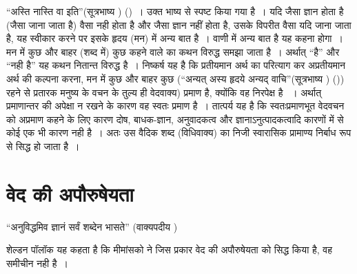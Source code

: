 \newpage

“अस्ति नास्ति वा इति”(सूत्रभाष्य ) ()~। उक्त भाष्य से स्पष्ट किया गया है~। यदि जैसा ज्ञान होता है (जैसा जाना जाता है) वैसा नही होता है और जैसा ज्ञान नहीं होता है, उसके विपरीत वैसा यदि जाना जाता है, यह स्वीकार करने पर इसके हृदय (मन) में अन्य बात है~। वाणी में अन्य बात है यह कहना होगा~। मन में कुछ और बाहर (शब्द में) कुछ कहने वाले का कथन विरुद्ध समझा जाता है~। अर्थात् “है” और “नही है” यह कथन नितान्त विरुद्ध है~। निष्कर्ष यह है कि प्रतीयमान अर्थ का परित्याग कर अप्रतीयमान अर्थ की कल्पना करना, मन में कुछ और बाहर कुछ (“अन्यत् अस्य हृदये अन्यद् वाचि”(सूत्रभाष्य ) ()) रहने से प्रतारक मनुष्य के वचन के तुल्य ही वेदवाक्य) प्रमाण है, क्योंकि वह निरपेक्ष है ~। अर्थात् प्रमाणान्तर की अपेक्षा न रखने के कारण वह स्वतः प्रमाण है~। तात्पर्य यह है कि स्वतःप्रमाणभूत वेदवचन को अप्रमाण कहने के लिए कारण दोष, बाधक-ज्ञान, अनुवादकत्व और ज्ञानाऽनुत्पादकत्वादि कारणों में से कोई एक भी कारण नही है~। अतः उस वैदिक शब्द (विधिवाक्य) का निजी स्वारासिक प्रामाण्य निर्बाध रूप से सिद्ध हो जाता है~।\\[-.95cm]

\section*{वेद की अपौरुषेयता}

“अनुविद्धमिव ज्ञानं सर्वं शब्देन भासते” (वाक्यपदीय )

शेल्डन पॉलॉक यह कहता है कि मीमांसको ने जिस प्रकार वेद की अपौरुषेयता को सिद्ध किया है, वह समीचीन नही है~।

\begin{myquote}

~\hfill {}
\end{myquote}

